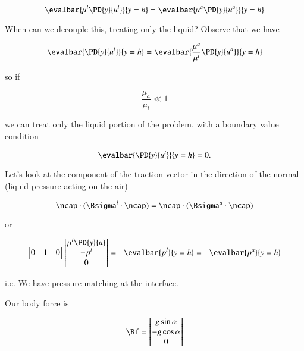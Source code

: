 \begin{equation}\label{eqn:continuumL12:250}
\evalbar{\mu^l \PD{y}{u^l}}{y = h} =
\evalbar{\mu^a \PD{y}{u^a}}{y = h}
\end{equation}

When can we decouple this, treating only the liquid?  Observe that we have

\begin{equation}\label{eqn:continuumL12:270}
\evalbar{\PD{y}{u^l}}{y = h} =
\evalbar{\frac{\mu^a}{\mu^l} \PD{y}{u^a}}{y = h}
\end{equation}

so if

\begin{equation}\label{eqn:continuumL12:290}
\frac{\mu_a}{\mu_l} \ll 1
\end{equation}

we can treat only the liquid portion of the problem, with a boundary value condition

\begin{equation}\label{eqn:continuumL12:310}
\evalbar{\PD{y}{u^l}}{y = h} = 0.
\end{equation}

Let's look at the component of the traction vector in the direction of the normal (liquid pressure acting on the air)

\begin{equation}\label{eqn:continuumL12:330}
\ncap \cdot (\Bsigma^l \cdot \ncap) = \ncap \cdot (\Bsigma^a \cdot \ncap)
\end{equation}

or

\begin{equation}\label{eqn:continuumL12:350}
\begin{bmatrix}
0 & 1 & 0
\end{bmatrix}
\begin{bmatrix}
\mu^l \PD{y}{u} \\
-p^l \\
0
\end{bmatrix}
= -\evalbar{p^l}{y = h} = -\evalbar{p^a}{y = h}
\end{equation}

i.e. We have pressure matching at the interface.

Our body force is

\begin{equation}\label{eqn:continuumL12:370}
\Bf =
\begin{bmatrix}
g \sin\alpha \\
-g \cos\alpha \\
0
\end{bmatrix}
\end{equation}

